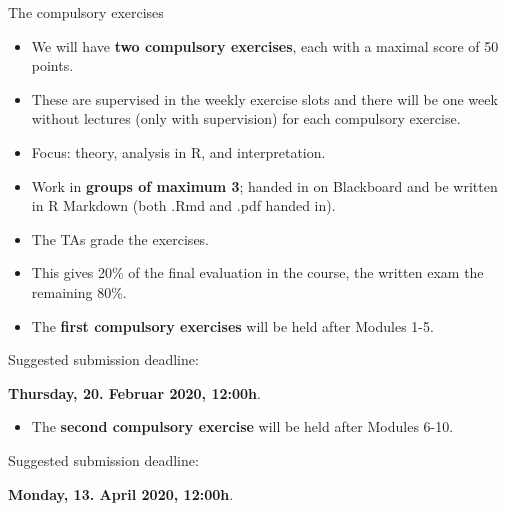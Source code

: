 \documentclass[10pt,ignorenonframetext,]{beamer}
\providecommand{\tightlist}{%
  \setlength{\itemsep}{0pt}\setlength{\parskip}{0pt}}
\begin{document}
\begin{frame}

\begin{block}{The compulsory exercises}

\begin{itemize}
\item
  We will have \textbf{two compulsory exercises}, each with a maximal
  score of 50 points.
\item
  These are supervised in the weekly exercise slots and there will be
  one week without lectures (only with supervision) for each compulsory
  exercise.
\item
  Focus: theory, analysis in R, and interpretation.
\item
  Work in \textbf{groups of maximum 3}; handed in on Blackboard and be
  written in R Markdown (both .Rmd and .pdf handed in).
\item
  The TAs grade the exercises.
\item
  This gives 20\% of the final evaluation in the course, the written
  exam the remaining 80\%.
\end{itemize}

\end{block}

\end{frame}

\begin{frame}

\begin{itemize}
\tightlist
\item
  The \textbf{first compulsory exercises} will be held after Modules
  1-5.
\end{itemize}

\hspace{8mm} Suggested submission deadline:

\hspace{8mm} \textbf{Thursday, 20. Februar 2020, 12:00h}.

\vspace{8mm}

\begin{itemize}
\tightlist
\item
  The \textbf{second compulsory exercise} will be held after Modules
  6-10.
\end{itemize}

\hspace{8mm}Suggested submission deadline:

\hspace{8mm}\textbf{Monday, 13. April 2020, 12:00h}.

\end{frame}
\end{document}
